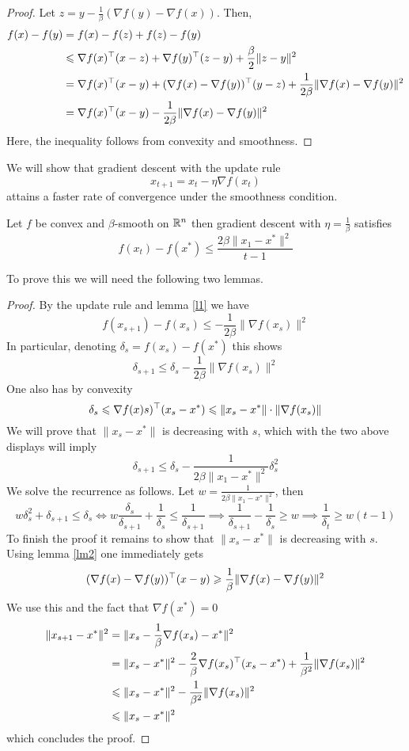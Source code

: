 \begin{proof}
Let $z = y - \frac{1}{\beta}(\nabla f(y) - \nabla f(x))$.  Then,
\begin{align*}
f(x) - f(y)
    &= f(x) - f(z) + f(z) - f(y) \\
    &\leqslant \nabla f(x)^\top(x-z) + \nabla f(y)^\top(z-y) + \frac{\beta}{2}\|z-y\|^2 \\
    &= \nabla f(x)^\top(x-y) + (\nabla f(x) - \nabla f(y))^\top(y-z) + \frac{1}{2\beta}\|\nabla f(x) - \nabla f(y)\|^2 \\
    &= \nabla f(x)^\top(x-y) - \frac{1}{2\beta} \|\nabla f(x) - \nabla f(y)\|^2
\end{align*}
Here, the inequality follows from convexity and smoothness.
\end{proof}


We will show that gradient descent with the update rule
$$x_{t+1} = x_t - \eta \nabla f(x_t)$$
attains a faster rate of convergence under the smoothness condition.

\begin{theorem}
Let $f$ be convex and $\beta$-smooth on $\mathbb{R}^n$ then gradient descent with $\eta = \frac{1}{\beta}$ satisfies
$$f(x_t) - f(x^*) \leq \frac{2\beta\|x_1 - x^*\|^2}{t-1}$$
\end{theorem}
To prove this we will need the following two lemmas.

\begin{proof}
By the update rule and lemma \ref{l1} we have
$$f(x_{s+1}) - f(x_s) \leq -\frac{1}{2\beta}\|\nabla f(x_s)\|^2 $$
In particular, denoting $\delta_s = f(x_s) - f(x^*)$ this shows
$$\delta_{s+1} \leq \delta_s - \frac{1}{2\beta}\|\nabla f(x_s)\|^2 $$
One also has by convexity
$$\delta_s \leqslant \nabla f(x)s)^\top(x_s - x^*) \leqslant \|x_s - x^*\| \cdot \|\nabla f(x_s)\|$$
We will prove that $\|x_s - x^*\|$ is decreasing with $s$, which with the two above displays will imply
$$\delta_{s+1}\leq \delta_s - \frac{1}{2\beta\|x_1 - x^*\|^2}\delta_s^2$$
We solve the recurrence as follows.  Let $w = \frac{1}{2\beta\|x_1 - x^*\|^2}$, then
$$w\delta_s^2 + \delta_{s+1} \leq \delta_s \iff w\frac{\delta_s}{\delta_{s+1}} + \frac
{1}{\delta_s} \leq \frac{1}{\delta_{s+1}} \implies \frac{1}{\delta_{s+1}} - \frac{1}{\delta_s} \geq w \implies \frac{1}{\delta_t} \geq w(t-1)$$
To finish the proof it remains to show that $\|x_s - x^*\|$ is decreasing with $s$.  Using lemma \ref{lm2} one immediately gets
$$ (\nabla f(x) - \nabla f(y))^\top(x - y) \geqslant \frac{1}{\beta} \|\nabla f(x) - \nabla f(y)\|^2$$
We use this and the fact that $\nabla f(x^*) = 0$
\begin{align}
    \|x_{s+1} - x^*\|^2 &= \|x_s - \frac{1}{\beta}\nabla f(x_s) - x^*\|^2 \\
    &= \|x_s - x^*\|^2 - \frac{2}{\beta}\nabla f(x_s)^\top(x_s - x^*) + \frac{1}{\beta^2}\|\nabla f(x_s)\|^2 \\
    &\leqslant \|x_s - x^*\|^2 - \frac{1}{\beta^2} \|\nabla f(x_s)\|^2 \\
    &\leqslant \|x_s - x^*\|^2
\end{align}
which concludes the proof.
\end{proof}

